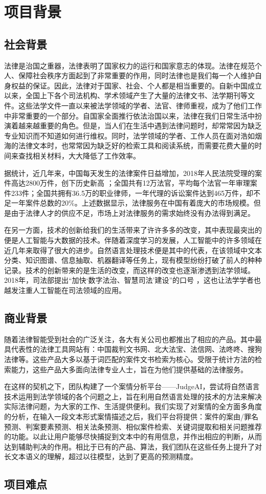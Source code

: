 \chapter{项目背景}
\label{cha:background}


\section{社会背景}
法律是治国之重器，法律表明了国家权力的运行和国家意志的体现。法律在规范个人、保障社会秩序方面起到了非常重要的作用，同时法律也是我们每一个人维护自身权益的保证。因此，法律对于国家、社会、个人都是相当重要的。自新中国成立以来，全国上下各个司法机构、学术领域产生了大量的法律文书、法学期刊等文件。这些法学文件一直以来被法学领域的学者、法官、律师重视，成为了他们工作中非常重要的一个部分。自国家全面推行依法治国以来，法律在我们日常生活中扮演着越来越重要的角色。但是，当人们在生活中遇到法律问题时，却常常因为缺乏专业知识而不知道如何进行维权。同时，法学领域的学者、工作人员在面对浩如烟海的法律文本时，也常常因为缺乏好的检索工具和阅读系统，而需要花费大量的时间来查找相关材料，大大降低了工作效率。

据统计，近几年来，中国每天发生的法律案件日益增加，2018年人民法院受理的案件高达2800万件，创下历史新高 ；全国共有12万法官，平均每个法官一年审理案件233件；全国共拥有36.5万的职业律师，一年代理的诉讼案件达到465万件，却不足一年案件总数的20\%。上述数据显示，法律服务在中国有着庞大的市场规模。但是由于法律人才的供应不足，市场上对法律服务的需求始终没有办法得到满足。 

在另一方面，技术的创新给我们的生活带来了许许多多的改变，其中表现最突出的便是人工智能与大数据的技术。伴随着深度学习的发展，人工智能中的许多领域在近几年来取得了很大的进步。自然语言处理技术便是其中的代表，在该领域中文本分类、知识图谱、信息抽取、机器翻译等任务上，现有模型纷纷打破了前人的种种记录。技术的创新带来的是生活的改变，而这样的改变也逐渐渗透到法学领域。2018年，司法部提出“加快‘数字法治、智慧司法’建设”的口号 ，这也让法学学者也越发注重人工智能在司法领域的应用。


\section{商业背景}
随着法律智能受到社会的广泛关注，各大有关公司也都推出了相应的产品。其中最具代表性的法律工具网站有：中国裁判文书网、北大法宝、法信网、法咚咚、搜狗法律等。这些产品大多以基于词匹配的案件文书检索为核心。受限于统计方法的检索能力，这些产品大多面向法律专业人士，旨在为他们提供基础的法律服务。


在这样的契机之下，团队构建了一个案情分析平台——JudgeAI，尝试将自然语言技术运用到法学领域的各个问题之上，旨在利用自然语言处理的技术的方法来解决实际法律问题，为大家的工作、生活提供便利。我们实现了对案情的全方面多角度的分析，在输入一段文本形式案情描述之后，我们平台将提供：案件的案由/罪名预测、判案要素预测、相关法条预测、相似案件检索、关键词提取和相关问题推荐的功能。以此让用户能够尽快捕捉到文本中的有用信息，并作出相应的判断，从而达到辅助判决的作用。相比于已有的产品、算法，我们团队在这些任务上提升了对长文本语义的理解，超过以往模型，达到了更高的预测精度。


\section{项目难点}





